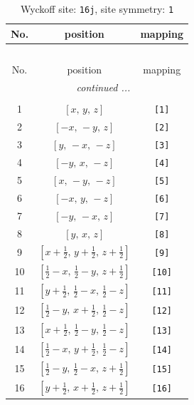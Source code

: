 \documentclass[fleqn,8pt]{jsarticle}
\begin{document}
\begin{longtable}{ccc}
\caption{Wyckoff site: {\tt 16j}, site symmetry: {\tt 1}}
 \\
 \hline \hline
No. & position & mapping \\ \hline \endfirsthead

\multicolumn{2}{l}{\tablename\ \thetable{}} \\
 \hline \hline
No. & position & mapping \\ \hline \endhead

 \hline \hline
\multicolumn{2}{r}{\footnotesize\it continued ...} \\ \endfoot

 \hline \hline
\multicolumn{2}{r}{} \\ \endlastfoot

1 & $\left[ x,\, y,\, z \right]$ & {\tt [1]} \\ \hline
2 & $\left[ - x,\, - y,\, z \right]$ & {\tt [2]} \\ \hline
3 & $\left[ y,\, - x,\, - z \right]$ & {\tt [3]} \\ \hline
4 & $\left[ - y,\, x,\, - z \right]$ & {\tt [4]} \\ \hline
5 & $\left[ x,\, - y,\, - z \right]$ & {\tt [5]} \\ \hline
6 & $\left[ - x,\, y,\, - z \right]$ & {\tt [6]} \\ \hline
7 & $\left[ - y,\, - x,\, z \right]$ & {\tt [7]} \\ \hline
8 & $\left[ y,\, x,\, z \right]$ & {\tt [8]} \\ \hline
9 & $\left[ x + \frac{1}{2},\, y + \frac{1}{2},\, z + \frac{1}{2} \right]$ & {\tt [9]} \\ \hline
10 & $\left[ \frac{1}{2} - x,\, \frac{1}{2} - y,\, z + \frac{1}{2} \right]$ & {\tt [10]} \\ \hline
11 & $\left[ y + \frac{1}{2},\, \frac{1}{2} - x,\, \frac{1}{2} - z \right]$ & {\tt [11]} \\ \hline
12 & $\left[ \frac{1}{2} - y,\, x + \frac{1}{2},\, \frac{1}{2} - z \right]$ & {\tt [12]} \\ \hline
13 & $\left[ x + \frac{1}{2},\, \frac{1}{2} - y,\, \frac{1}{2} - z \right]$ & {\tt [13]} \\ \hline
14 & $\left[ \frac{1}{2} - x,\, y + \frac{1}{2},\, \frac{1}{2} - z \right]$ & {\tt [14]} \\ \hline
15 & $\left[ \frac{1}{2} - y,\, \frac{1}{2} - x,\, z + \frac{1}{2} \right]$ & {\tt [15]} \\ \hline
16 & $\left[ y + \frac{1}{2},\, x + \frac{1}{2},\, z + \frac{1}{2} \right]$ & {\tt [16]} \\
\end{longtable}
\end{document}
